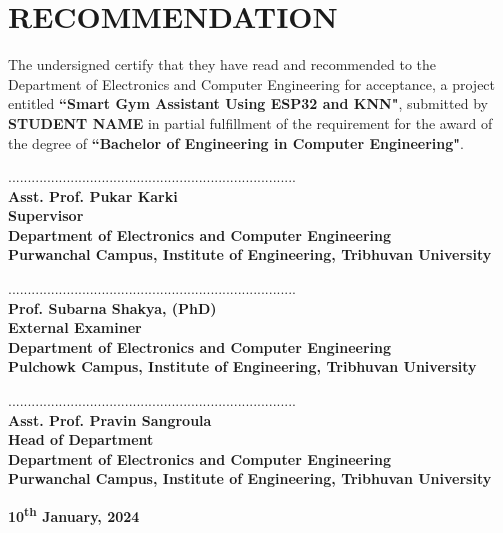 \chapter*{RECOMMENDATION}
The undersigned certify that they have read and recommended to the Department of
Electronics and Computer Engineering for acceptance, a project entitled \textbf{``Smart Gym Assistant Using ESP32 and KNN"}, submitted by \textbf{STUDENT NAME} in partial fulfillment of the requirement for the award of the degree of \textbf{``Bachelor of Engineering in Computer Engineering"}.\par
        \vspace{1cm}
..........................................................................\\
\textbf{Asst. Prof. Pukar Karki\\
Supervisor\\
Department of Electronics and Computer Engineering\\
Purwanchal Campus, Institute of Engineering, Tribhuvan University}\par
        \vspace{1cm}
..........................................................................\\
\textbf{Prof. Subarna Shakya, (PhD)\\
External Examiner \\
Department of Electronics and Computer Engineering\\
Pulchowk Campus, Institute of Engineering, Tribhuvan University}\par
        \vspace{1cm}
..........................................................................\\
\textbf{
Asst. Prof. Pravin Sangroula\\ 
Head of Department \\
Department of Electronics and Computer Engineering\\Purwanchal Campus, Institute of Engineering, Tribhuvan University}\par
\vspace{2.5cm}

\begin{center}
\textbf{10\textsuperscript{th} January, 2024}
\end{center}
\newpage

